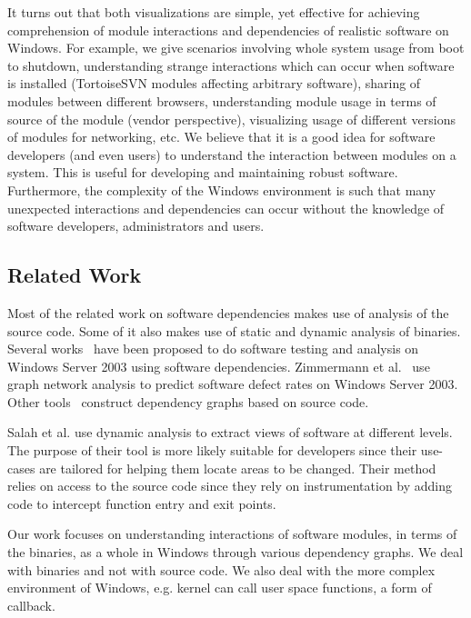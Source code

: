It turns out that both visualizations are simple, yet effective for
achieving comprehension of module interactions and dependencies
of realistic software on Windows. For example, we give scenarios
involving whole system usage from boot to shutdown, understanding strange
interactions which can occur when software is installed (TortoiseSVN modules
affecting arbitrary software), sharing of modules between different browsers,
understanding module usage in terms of source of the module
(vendor perspective),
visualizing usage of different versions of modules for networking, etc.
We believe that it is a good idea for software developers (and even users)
to understand the interaction between modules on a system.
This is useful for developing and maintaining
robust software. Furthermore, the complexity of the
Windows environment is such that many unexpected interactions
and dependencies can occur without the knowledge of software developers,
administrators and users.

\subsection{Related Work}

Most of the related work on software dependencies makes use of analysis
of the source code. Some of it also makes use of static and
dynamic analysis of binaries.
Several works~\cite{srivastava2005efficient,nagappan2007using}
have been proposed to do software testing and analysis on Windows Server 2003
using software dependencies.
Zimmermann et al.~\cite{zimmermann2008predicting} use graph network analysis
to predict software defect rates on Windows Server 2003.
Other tools~\cite{wilde1989dependency,wilhelm2005dependency}
construct dependency graphs based on source code.

Salah et al.\cite{salah2004hierarchy,salah2006scenario} use dynamic analysis to
extract views of software at different levels.
The purpose of their tool is more likely
suitable for developers since their use-cases are tailored for helping
them locate areas to be changed. Their method relies on access to the source
code since they rely on instrumentation by adding code to intercept function
entry and exit points.

Our work focuses on understanding interactions of software modules,
in terms of the binaries, as a whole in Windows through
various dependency graphs. We deal with binaries and not with source code.
We also deal with the more complex environment of Windows, e.g. kernel
can call user space functions, a form of callback.
